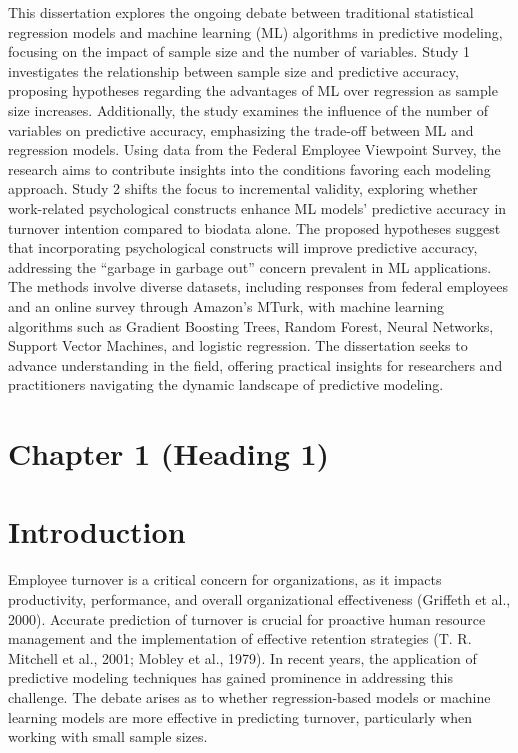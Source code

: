 \documentclass[
  man]{apa7}
\begin{document}
This dissertation explores the ongoing debate between traditional statistical regression models and machine learning (ML) algorithms in predictive modeling, focusing on the impact of sample size and the number of variables. Study 1 investigates the relationship between sample size and predictive accuracy, proposing hypotheses regarding the advantages of ML over regression as sample size increases. Additionally, the study examines the influence of the number of variables on predictive accuracy, emphasizing the trade-off between ML and regression models. Using data from the Federal Employee Viewpoint Survey, the research aims to contribute insights into the conditions favoring each modeling approach. Study 2 shifts the focus to incremental validity, exploring whether work-related psychological constructs enhance ML models' predictive accuracy in turnover intention compared to biodata alone. The proposed hypotheses suggest that incorporating psychological constructs will improve predictive accuracy, addressing the ``garbage in garbage out'' concern prevalent in ML applications. The methods involve diverse datasets, including responses from federal employees and an online survey through Amazon's MTurk, with machine learning algorithms such as Gradient Boosting Trees, Random Forest, Neural Networks, Support Vector Machines, and logistic regression. The dissertation seeks to advance understanding in the field, offering practical insights for researchers and practitioners navigating the dynamic landscape of predictive modeling.

\newpage
{}
\renewcommand{\headrulewidth}{0pt}
\renewcommand{\footrulewidth}{0pt}

\tableofcontents

\section{Chapter 1 (Heading 1)}
\newpage

\hypertarget{introduction}{%
\section{Introduction}\label{introduction}}

Employee turnover is a critical concern for organizations, as it impacts productivity, performance, and overall organizational effectiveness (Griffeth et al., 2000).
Accurate prediction of turnover is crucial for proactive human resource management and the implementation of effective retention strategies (T. R. Mitchell et al., 2001; Mobley et al., 1979).
In recent years, the application of predictive modeling techniques has gained prominence in addressing this challenge.
The debate arises as to whether regression-based models or machine learning models are more effective in predicting turnover, particularly when working with small sample sizes.
\end{document}
